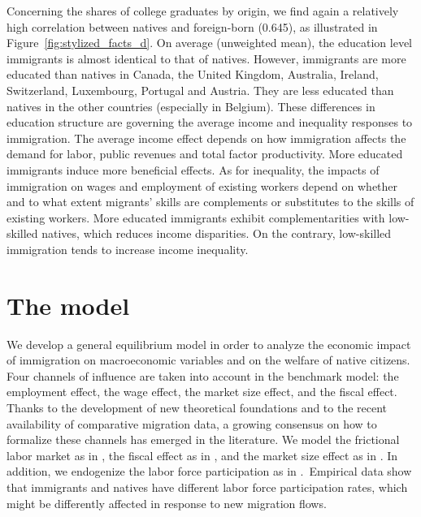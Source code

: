 \documentclass[a4paper,12pt]{article}
\begin{document}
Concerning the shares of college graduates by origin, we find again a relatively high correlation between natives and foreign-born (0.645), as illustrated in Figure~\ref{fig:stylized_facts_d}. On average (unweighted mean), the education level immigrants is almost identical to that of natives. However, immigrants are more educated than natives in Canada, the United Kingdom, Australia, Ireland, Switzerland, Luxembourg, Portugal and Austria. They are less educated than natives in the other countries (especially in Belgium). These differences in education structure are governing the average income and inequality responses to immigration. The average income effect depends on how immigration affects the demand for labor, public revenues and total factor productivity. More educated immigrants induce more beneficial effects. As for inequality, the impacts of immigration on wages and employment of existing workers depend on whether and to what extent migrants’ skills are complements or substitutes to the skills of existing workers. More educated immigrants exhibit complementarities with low-skilled natives, which reduces income disparities. On the contrary, low-skilled immigration tends to increase income inequality.

\section{The model} \label{model}
We develop a general equilibrium model in order to analyze the economic impact of immigration on macroeconomic variables and on the welfare of native citizens. Four channels of influence are taken into account in the benchmark model: the employment effect, the wage effect, the market size effect, and the fiscal effect. Thanks to the development of new theoretical foundations and to the recent availability of comparative migration data, a growing consensus on how to formalize these channels has emerged in the literature. We model the frictional labor market as in \citet{Battisti2018}, the fiscal effect as in \citet{Storesletten2000}, and the market size effect as in \citet{Krugman1980}. In addition, we endogenize the labor force participation as in \citet{Burzynski2018}.\ Empirical data show that immigrants and natives have different labor force participation rates, which might be differently affected in response to new migration flows.
\end{document}
